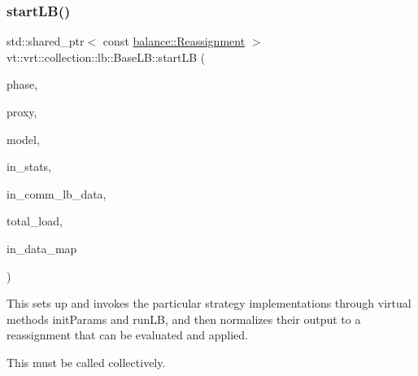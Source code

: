 \subsubsection{\texorpdfstring{start\+L\+B()}{startLB()}}
{\footnotesize\ttfamily std\+::shared\+\_\+ptr$<$ const \hyperlink{structvt_1_1vrt_1_1collection_1_1balance_1_1_reassignment}{balance\+::\+Reassignment} $>$ vt\+::vrt\+::collection\+::lb\+::\+Base\+L\+B\+::start\+LB (\begin{DoxyParamCaption}\item[{\hyperlink{namespacevt_a46ce6733d5cdbd735d561b7b4029f6d7}{Phase\+Type}}]{phase,  }\item[{\hyperlink{structvt_1_1objgroup_1_1proxy_1_1_proxy}{objgroup\+::proxy\+::\+Proxy}$<$ \hyperlink{structvt_1_1vrt_1_1collection_1_1lb_1_1_base_l_b}{Base\+LB} $>$}]{proxy,  }\item[{\hyperlink{structvt_1_1vrt_1_1collection_1_1balance_1_1_load_model}{balance\+::\+Load\+Model} $\ast$}]{model,  }\item[{\hyperlink{structvt_1_1vrt_1_1collection_1_1lb_1_1_base_l_b_acd9bdad961ac83c96b7a227de672f96c}{Statistic\+Map\+Type} const \&}]{in\+\_\+stats,  }\item[{\hyperlink{structvt_1_1vrt_1_1collection_1_1lb_1_1_base_l_b_a83eb4daec14edfb8780422e95b8e38d3}{Element\+Comm\+Type} const \&}]{in\+\_\+comm\+\_\+lb\+\_\+data,  }\item[{\hyperlink{namespacevt_a8fb51741340b87d7aaee0bef60e9896b}{Load\+Type}}]{total\+\_\+load,  }\item[{\hyperlink{namespacevt_1_1vrt_1_1collection_1_1balance_acf152c668ed9e2e9c6b29784181d2435}{balance\+::\+Data\+Map\+Type} const \&}]{in\+\_\+data\+\_\+map }\end{DoxyParamCaption})}



This sets up and invokes the particular strategy implementations through virtual methods {\ttfamily init\+Params} and {\ttfamily run\+LB}, and then normalizes their output to a reassignment that can be evaluated and applied. 

This must be called collectively.


